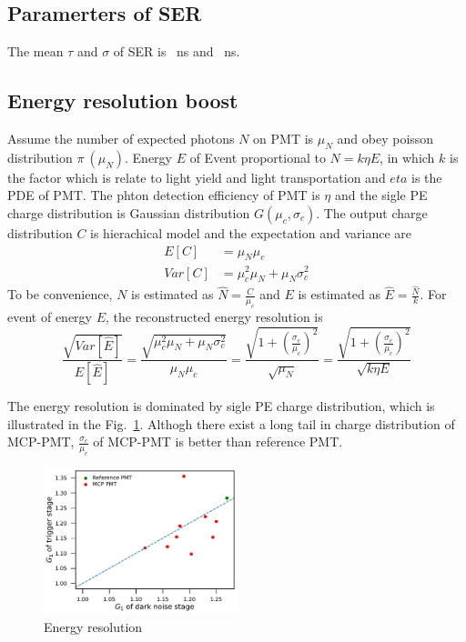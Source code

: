 \subsection{Paramerters of SER}
The mean $\tau$ and $\sigma$ of SER is \SI{}{ns} and \SI{}{ns}.
\subsection{Energy resolution boost}

Assume the number of expected photons $N$ on PMT is $\mu_N$ and obey poisson distribution $\pi~(\mu_N)$. Energy $E$ of Event proportional to $N=k\eta E$, in which $k$ is the factor which is relate to light yield and light transportation and $eta$ is the PDE of PMT. The phton detection efficiency of PMT is $\eta$ and the sigle PE charge distribution is Gaussian distribution $G(\mu_c,\sigma_c)$. The output charge distribution $C$ is hierachical model and the expectation and variance are
\begin{align}
    E[C]&=\mu_N\mu_c\\
    Var[C]&=\mu_c^2\mu_N+\mu_N\sigma_c^2
\end{align}
To be convenience, $N$ is estimated as $\hat{N}=\frac{C}{\mu_c}$ and $E$ is estimated as $\hat{E}=\frac{\hat{N}}{k}$. For event of energy $E$, the reconstructed energy resolution is 
\begin{equation}
    \frac{\sqrt{Var[\hat{E}]}}{E[\hat{E}]}=\frac{\sqrt{\mu_c^2\mu_N+\mu_N\sigma_c^2}}{\mu_N\mu_c}=\frac{\sqrt{1+(\frac{\sigma_c}{\mu_c})^2}}{\sqrt{\mu_N}}=\frac{\sqrt{1+(\frac{\sigma_c}{\mu_c})^2}}{\sqrt{k\eta E}}
\end{equation}

The energy resolution is dominated by sigle PE charge distribution, which is illustrated in the Fig.~\ref{fig:EnergyResolution}. Althogh there exist a long tail in charge distribution of MCP-PMT, $\frac{\sigma_c}{\mu_c}$ of MCP-PMT is better than reference PMT.
\begin{figure}[!htbp]
    \centering
    \includegraphics[width=0.5\textwidth,page=14]{figures/result/compare.pdf}
    \caption{Energy resolution}
    \label{fig:EnergyResolution}
\end{figure}